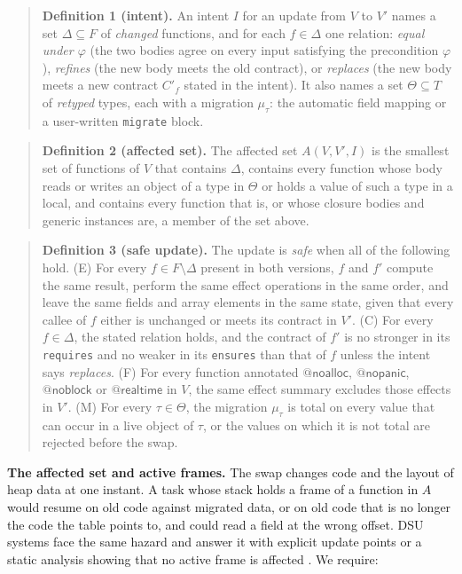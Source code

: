 \documentclass[10pt,twocolumn]{article}
\begin{document}
\begin{quote}
\textbf{Definition 1 (intent).} An intent $I$ for an update from $V$ to $V'$ names a set $\Delta \subseteq F$ of \emph{changed} functions, and for each $f \in \Delta$ one relation: \emph{equal under $\varphi$} (the two bodies agree on every input satisfying the precondition $\varphi$), \emph{refines} (the new body meets the old contract), or \emph{replaces} (the new body meets a new contract $C'_f$ stated in the intent). It also names a set $\Theta \subseteq T$ of \emph{retyped} types, each with a migration $\mu_\tau$: the automatic field mapping or a user-written \texttt{migrate} block.
\end{quote}
\begin{quote}
\textbf{Definition 2 (affected set).} The affected set $A(V, V', I)$ is the smallest set of functions of $V$ that contains $\Delta$, contains every function whose body reads or writes an object of a type in $\Theta$ or holds a value of such a type in a local, and contains every function that is, or whose closure bodies and generic instances are, a member of the set above.
\end{quote}
\begin{quote}
\textbf{Definition 3 (safe update).} The update is \emph{safe} when all of the following hold. (E) For every $f \in F \setminus \Delta$ present in both versions, $f$ and $f'$ compute the same result, perform the same effect operations in the same order, and leave the same fields and array elements in the same state, given that every callee of $f$ either is unchanged or meets its contract in $V'$. (C) For every $f \in \Delta$, the stated relation holds, and the contract of $f'$ is no stronger in its \texttt{requires} and no weaker in its \texttt{ensures} than that of $f$ unless the intent says \emph{replaces}. (F) For every function annotated $\mathsf{@noalloc}$, $\mathsf{@nopanic}$, $\mathsf{@noblock}$ or $\mathsf{@realtime}$ in $V$, the same effect summary excludes those effects in $V'$. (M) For every $\tau \in \Theta$, the migration $\mu_\tau$ is total on every value that can occur in a live object of $\tau$, or the values on which it is not total are rejected before the swap.
\end{quote}
\textbf{The affected set and active frames.} The swap changes code and the layout of heap data at one instant. A task whose stack holds a frame of a function in $A$ would resume on old code against migrated data, or on old code that is no longer the code the table points to, and could read a field at the wrong offset. DSU systems face the same hazard and answer it with explicit update points \cite{hayden2012kitsune} or a static analysis showing that no active frame is affected \cite{stoyle2005proteus}. We require:
\end{document}
